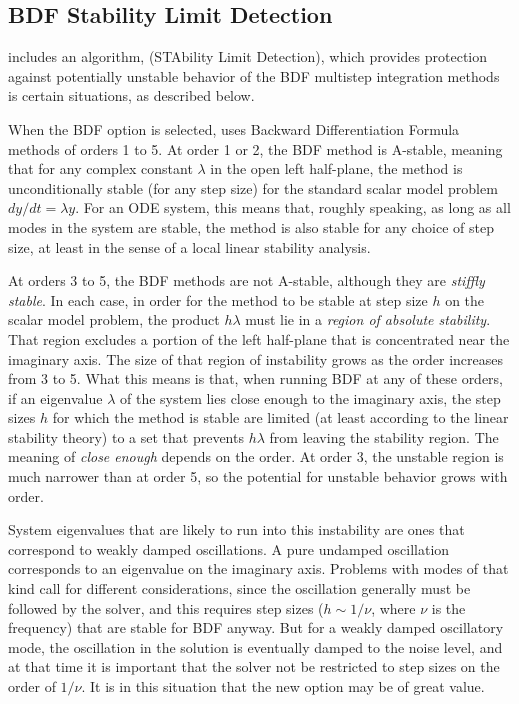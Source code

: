 \subsection{BDF Stability Limit Detection}

{\cvode} includes an algorithm, {\stald} (STAbility Limit Detection),
which provides protection against potentially unstable behavior of the 
BDF multistep integration methods is certain situations, as described below.

When the BDF option is selected, {\cvode} uses Backward Differentiation 
Formula methods of orders 1 to 5.  At order 1 or 2, the BDF
method is A-stable, meaning that for any complex constant $\lambda$ in
the open left half-plane, the method is unconditionally stable (for
any step size) for the standard scalar model problem $dy/dt = \lambda y$.
For an ODE system, this means that, roughly speaking, as long as all
modes in the system are stable, the method is also stable for any
choice of step size, at least in the sense of a local linear stability
analysis.

At orders 3 to 5, the BDF methods are not A-stable, although they are
{\em stiffly stable}. In each case, in order for the method to be stable
at step size $h$ on the scalar model problem, the product $h\lambda$ must
lie in a {\em region of absolute stability}. 
That region excludes a portion of the left half-plane that is concentrated 
near the imaginary axis.  The size of that region of instability grows as the order
increases from 3 to 5.  What this means is that, when running BDF at
any of these orders, if an eigenvalue $\lambda$ of the system lies close
enough to the imaginary axis, the step sizes $h$ for which the method is
stable are limited (at least according to the linear stability theory)
to a set that prevents $h\lambda$ from leaving the stability region.
The meaning of {\em close enough} depends on the order.  
At order 3, the unstable region is much narrower than at order 5, 
so the potential for unstable behavior grows with order.

System eigenvalues that are likely to run into this instability are
ones that correspond to weakly damped oscillations.  A pure undamped
oscillation corresponds to an eigenvalue on the imaginary axis.
Problems with modes of that kind call for different considerations,
since the oscillation generally must be followed by the solver, and
this requires step sizes ($h \sim 1/\nu$, where $\nu$ is the frequency) 
that are stable for BDF anyway.  But for a weakly damped oscillatory mode,
the oscillation in the solution is eventually damped to the noise level, 
and at that time it is important that the solver not be restricted to step 
sizes on the order of $1/\nu$.  It is in this situation that the new option may
be of great value.

